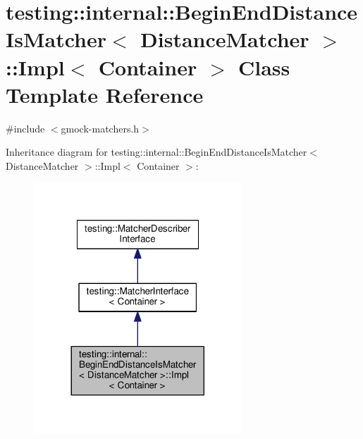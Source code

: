 \hypertarget{classtesting_1_1internal_1_1BeginEndDistanceIsMatcher_1_1Impl}{}\section{testing\+:\+:internal\+:\+:Begin\+End\+Distance\+Is\+Matcher$<$ Distance\+Matcher $>$\+:\+:Impl$<$ Container $>$ Class Template Reference}
\label{classtesting_1_1internal_1_1BeginEndDistanceIsMatcher_1_1Impl}


{\ttfamily \#include $<$gmock-\/matchers.\+h$>$}



Inheritance diagram for testing\+:\+:internal\+:\+:Begin\+End\+Distance\+Is\+Matcher$<$ Distance\+Matcher $>$\+:\+:Impl$<$ Container $>$\+:\nopagebreak
\begin{figure}[H]
\begin{center}
\leavevmode
\includegraphics[width=221pt]{classtesting_1_1internal_1_1BeginEndDistanceIsMatcher_1_1Impl__inherit__graph}
\end{center}
\end{figure}


